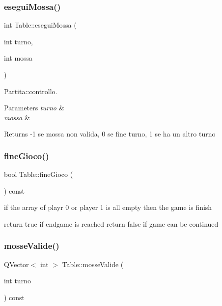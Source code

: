 \subsubsection{\texorpdfstring{esegui\+Mossa()}{eseguiMossa()}}
{\footnotesize\ttfamily int Table\+::esegui\+Mossa (\begin{DoxyParamCaption}\item[{int}]{turno,  }\item[{int}]{mossa }\end{DoxyParamCaption})}



Partita\+::controllo. 


\begin{DoxyParams}{Parameters}
{\em turno} & \\
\hline
{\em mossa} & \\
\hline
\end{DoxyParams}
\begin{DoxyReturn}{Returns}
-\/1 se mossa non valida, 0 se fine turno, 1 se ha un altro turno 
\end{DoxyReturn}
\mbox{\label{classTable_aa8597647b9049a5403941e3b05cd17cd}} 
\subsubsection{\texorpdfstring{fine\+Gioco()}{fineGioco()}}
{\footnotesize\ttfamily bool Table\+::fine\+Gioco (\begin{DoxyParamCaption}{ }\end{DoxyParamCaption}) const}

if the array of playr 0 or player 1 is all empty then the game is finish

return true if endgame is reached return false if game can be continued \mbox{\label{classTable_aa8f05fc3ad41761c70e62e118af5b515}} 
\subsubsection{\texorpdfstring{mosse\+Valide()}{mosseValide()}}
{\footnotesize\ttfamily Q\+Vector$<$ int $>$ Table\+::mosse\+Valide (\begin{DoxyParamCaption}\item[{int}]{turno }\end{DoxyParamCaption}) const}



